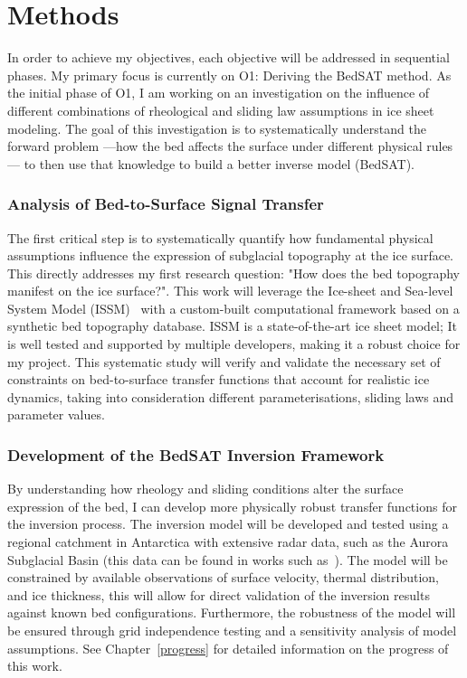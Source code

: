 \chapter{Methods}

In order to achieve my objectives, each objective will be addressed in sequential phases. My primary focus is currently on O1: Deriving the BedSAT method. As the initial phase of O1, I am working on an investigation on the influence of different combinations of rheological and sliding law assumptions in ice sheet modeling. The goal of this investigation is to systematically understand the forward problem —how the bed affects the surface under different physical rules— to then use that knowledge to build a better inverse model (BedSAT).

\subsection{Analysis of Bed-to-Surface Signal Transfer}\label{paper1}
The first critical step is to systematically quantify how fundamental physical assumptions influence the expression of subglacial topography at the ice surface.
This directly addresses my first research question: "How does the bed topography manifest on the ice surface?". This work will leverage the Ice-sheet and Sea-level System Model (ISSM)~\cite{Larour_2012} with a custom-built computational framework based on a synthetic bed topography database. ISSM is a state-of-the-art ice sheet model; It is well tested and supported by multiple developers, making it a robust choice for my project. This systematic study will verify and validate the necessary set of constraints on bed-to-surface transfer functions that account for realistic ice dynamics, taking into consideration different parameterisations, sliding laws and parameter values.

\subsection{Development of the BedSAT Inversion Framework}
By understanding how rheology and sliding conditions alter the surface expression of the bed, I can develop more physically robust transfer functions for the inversion process. The inversion model will be developed and tested using a regional catchment in Antarctica with extensive radar data, such as the Aurora Subglacial Basin (this data can be found in works such as~\cite{Young_2011}). The model will be constrained by available observations of surface velocity, thermal distribution, and ice thickness, this will allow for direct validation of the inversion results against known bed configurations. Furthermore, the robustness of the model will be ensured through grid independence testing and a sensitivity analysis of model assumptions. See Chapter~\ref{progress} for detailed information on the progress of this work.

